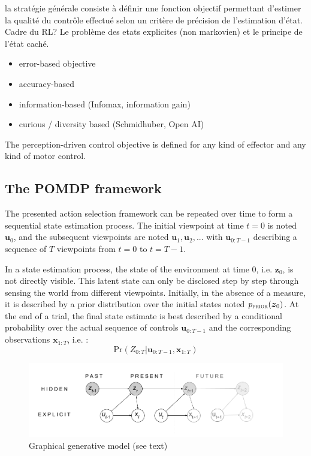 \documentclass[12pt,twoside,openright]{article}
\begin{document}
{\color{magenta} la stratégie générale consiste à définir une fonction objectif permettant d'estimer la qualité du contrôle effectué selon un critère de précision de l'estimation d'état. Cadre du RL? Le problème des etats explicites (non markovien) et le principe de l'état caché.}

{\color{blue} 
	\begin{itemize}
		\item error-based objective
		\item accuracy-based
		\item information-based (Infomax, information gain)
		\item curious / diversity based  (Schmidhuber, Open AI)
	\end{itemize}
	
	
	The perception-driven control objective is defined for any kind of effector and any kind of motor control.} 

\subsection{The POMDP framework}

The presented action selection framework can be repeated over time to form a sequential state estimation process. 
The initial viewpoint at time $t=0$ is noted $\boldsymbol{u}_0$, and the subsequent viewpoints  are noted $\boldsymbol{u}_1, \boldsymbol{u}_2, ...$ with $\boldsymbol{u}_{0:T-1}$ describing a sequence of $T$ viewpoints from $t=0$ to $t=T-1$. %

In a state estimation process, the state of the environment at time 0, i.e. $\boldsymbol{z}_0$, is not directly visible. This latent state can only be disclosed step by step through sensing the world from different viewpoints. Initially, in the absence of a measure, it is described by a prior distribution over the initial states noted $p_\text{\sc prior}(\boldsymbol{z}_0)$. At the end of a trial, the final state estimate is best described by a conditional probability over the actual sequence of controls $\boldsymbol{u}_{0:T-1}$ and the corresponding observations $\boldsymbol{x}_{1:T}$, i.e. :
$$\text{Pr}(Z_{0:T}|\boldsymbol{u}_{0:T-1}, \boldsymbol{x}_{1:T})$$

\begin{figure}[t!]
	\centerline{
		\includegraphics[width = \linewidth]{img/ICLR-graphical-v2.png} 
	}
	\caption{Graphical generative model (see text)}\label{fig:pomdp}
\end{figure}
\end{document}

